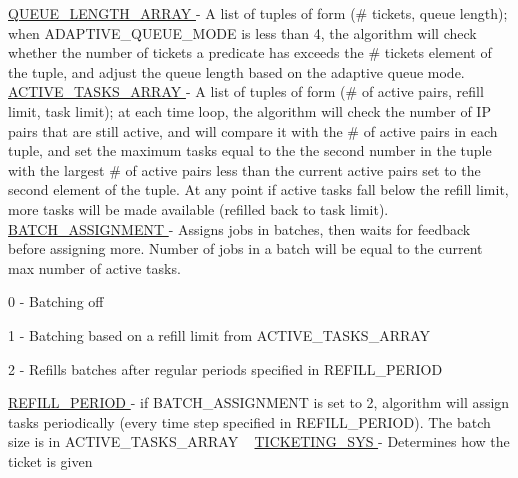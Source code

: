 \hyperlink{namespacedynamicfilterapp_1_1toggles_af8d4fe75258dd9f8b4c8cdb1b5b68ad1}{Q\+U\+E\+U\+E\+\_\+\+L\+E\+N\+G\+T\+H\+\_\+\+A\+R\+R\+AY } -\/ A list of tuples of form (\# tickets, queue length); when A\+D\+A\+P\+T\+I\+V\+E\+\_\+\+Q\+U\+E\+U\+E\+\_\+\+M\+O\+DE is less than 4, the algorithm will check whether the number of tickets a predicate has exceeds the \# tickets element of the tuple, and adjust the queue length based on the adaptive queue mode. ~\newline
 \hyperlink{namespacedynamicfilterapp_1_1toggles_a8f7b1e7beea29c74a7defab7d44ef294}{A\+C\+T\+I\+V\+E\+\_\+\+T\+A\+S\+K\+S\+\_\+\+A\+R\+R\+AY } -\/ A list of tuples of form (\# of active pairs, refill limit, task limit); at each time loop, the algorithm will check the number of IP pairs that are still active, and will compare it with the \# of active pairs in each tuple, and set the maximum tasks equal to the the second number in the tuple with the largest \# of active pairs less than the current active pairs set to the second element of the tuple. At any point if active tasks fall below the refill limit, more tasks will be made available (refilled back to task limit). ~\newline
 \hyperlink{namespacedynamicfilterapp_1_1toggles_ab1f6b66c3fc1afbd280b14695b54f33f}{B\+A\+T\+C\+H\+\_\+\+A\+S\+S\+I\+G\+N\+M\+E\+NT } -\/ Assigns jobs in batches, then waits for feedback before assigning more. Number of jobs in a batch will be equal to the current max number of active tasks.
\begin{DoxyItemize}
\item 0 -\/ Batching off
\item 1 -\/ Batching based on a refill limit from A\+C\+T\+I\+V\+E\+\_\+\+T\+A\+S\+K\+S\+\_\+\+A\+R\+R\+AY
\item 2 -\/ Refills batches after regular periods specified in R\+E\+F\+I\+L\+L\+\_\+\+P\+E\+R\+I\+OD
\end{DoxyItemize}

\hyperlink{namespacedynamicfilterapp_1_1toggles_a26c4f956b0a9438426925bee66b89a2b}{R\+E\+F\+I\+L\+L\+\_\+\+P\+E\+R\+I\+OD } -\/ if B\+A\+T\+C\+H\+\_\+\+A\+S\+S\+I\+G\+N\+M\+E\+NT is set to 2, algorithm will assign tasks periodically (every time step specified in R\+E\+F\+I\+L\+L\+\_\+\+P\+E\+R\+I\+OD). The batch size is in A\+C\+T\+I\+V\+E\+\_\+\+T\+A\+S\+K\+S\+\_\+\+A\+R\+R\+AY ~\newline
 \hyperlink{namespacedynamicfilterapp_1_1toggles_a4efd3667e6643a4cd2b96c4e647fa2f7}{T\+I\+C\+K\+E\+T\+I\+N\+G\+\_\+\+S\+YS } -\/ Determines how the ticket is given ~\newline

